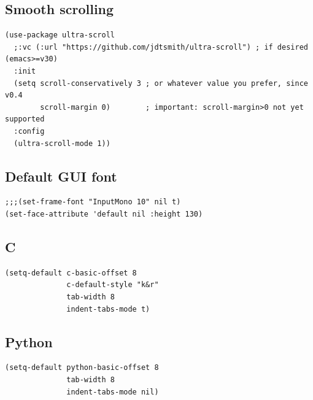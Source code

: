 \documentclass[10pt]{article}
\begin{document}
\subsection{Smooth scrolling}
\label{sec:orgc55c12a}
\begin{verbatim}
(use-package ultra-scroll
  ;:vc (:url "https://github.com/jdtsmith/ultra-scroll") ; if desired (emacs>=v30)
  :init
  (setq scroll-conservatively 3 ; or whatever value you prefer, since v0.4
        scroll-margin 0)        ; important: scroll-margin>0 not yet supported
  :config
  (ultra-scroll-mode 1))
\end{verbatim}
\subsection{Default GUI font}
\label{sec:org22987c1}
\begin{verbatim}
;;;(set-frame-font "InputMono 10" nil t)
(set-face-attribute 'default nil :height 130)
\end{verbatim}
\subsection{C}
\label{sec:orgc7d72bf}

\begin{verbatim}
(setq-default c-basic-offset 8
              c-default-style "k&r"
              tab-width 8
              indent-tabs-mode t)
\end{verbatim}
\subsection{Python}
\label{sec:orgcc4f072}
\begin{verbatim}
(setq-default python-basic-offset 8
              tab-width 8
              indent-tabs-mode nil)
\end{verbatim}
\end{document}
